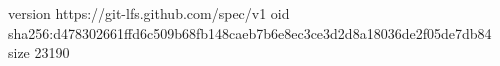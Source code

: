version https://git-lfs.github.com/spec/v1
oid sha256:d478302661ffd6c509b68fb148caeb7b6e8ec3ce3d2d8a18036de2f05de7db84
size 23190
